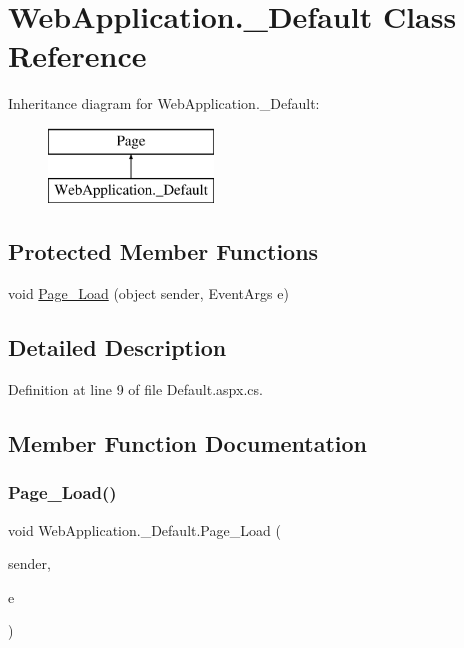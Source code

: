 \hypertarget{classWebApplication_1_1__Default}{}\section{Web\+Application.\+\_\+\+Default Class Reference}
\label{classWebApplication_1_1__Default}
Inheritance diagram for Web\+Application.\+\_\+\+Default\+:\begin{figure}[H]
\begin{center}
\leavevmode
\includegraphics[height=2.000000cm]{d6/df0/classWebApplication_1_1__Default}
\end{center}
\end{figure}
\subsection*{Protected Member Functions}
\begin{DoxyCompactItemize}
\item 
void \mbox{\hyperlink{classWebApplication_1_1__Default_a774fea88a9ee1de6a35a9df129075a8a}{Page\+\_\+\+Load}} (object sender, Event\+Args e)
\end{DoxyCompactItemize}


\subsection{Detailed Description}


Definition at line 9 of file Default.\+aspx.\+cs.



\subsection{Member Function Documentation}
\mbox{\label{classWebApplication_1_1__Default_a774fea88a9ee1de6a35a9df129075a8a}} 
\subsubsection{\texorpdfstring{Page\_Load()}{Page\_Load()}}
{\footnotesize\ttfamily void Web\+Application.\+\_\+\+Default.\+Page\+\_\+\+Load (\begin{DoxyParamCaption}\item[{object}]{sender,  }\item[{Event\+Args}]{e }\end{DoxyParamCaption})\hspace{0.3cm}{\ttfamily [protected]}}



